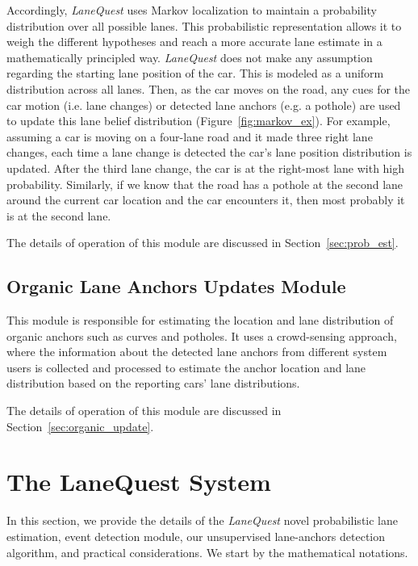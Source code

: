 \documentclass[10pt, conference, compsocconf]{IEEEtran}
\newcommand{\system}{LaneQuest}
\def \sys {\textit{LaneQuest}}
\begin{document}
Accordingly, \sys{} uses Markov localization to maintain a probability distribution over all possible lanes. This probabilistic representation allows it to weigh the different hypotheses and reach a more accurate lane estimate in a mathematically principled way. \sys{} does not make any assumption regarding the starting lane position of the car. This is modeled as a uniform distribution across all lanes. Then, as the car moves on the road, any  cues for the car motion (i.e. lane changes) or detected lane anchors (e.g. a pothole) are used to update this lane belief distribution (Figure~\ref{fig:markov_ex}).  For example, assuming a car is moving on a four-lane road and it made three right lane changes, each  time a lane change is detected the car's lane position distribution is updated. After the third lane change, the car is at the right-most lane with high probability. Similarly, if we know that the road has a pothole at the second lane around the current car location and the car encounters it, then most probably it is at the second lane.

The details of operation of this module are discussed in Section~\ref{sec:prob_est}.
\subsection{Organic Lane Anchors Updates Module}
This module is responsible for estimating the location and lane distribution of organic anchors such as curves and potholes. It uses a crowd-sensing approach, where the information about the detected lane anchors from different system users is collected and processed to estimate the anchor location and lane distribution based on the reporting cars' lane distributions.

The details of operation of this module are discussed in Section~\ref{sec:organic_update}.
\section{The \system{} System}\label{sec:system}
In this section, we provide the details of the \sys{} novel probabilistic lane estimation, event detection module, our unsupervised lane-anchors detection algorithm, and practical considerations. We start by the mathematical notations.
\end{document}
